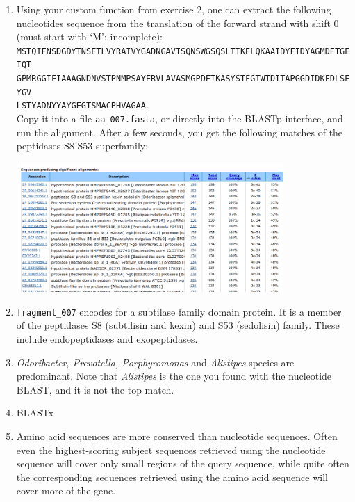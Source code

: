 \documentclass[a4paper,11pt]{article}
\begin{document}
\begin{enumerate}
\item Using your custom function from exercise 2, one can extract the following nucleotides sequence from the translation of the forward strand with shift 0 (must start with `M'; incomplete): \\ \texttt{MSTQIFNSDGDYTNSETLVYRAIVYGADNGAVISQNSWGSQSLTIKELQKAAIDYFIDYAGMDETGEIQT \\ GPMRGGIFIAAAGNDNVSTPNMPSAYERVLAVASMGPDFTKASYSTFGTWTDITAPGGDIDKFDLSEYGV \\ LSTYADNYYAYGEGTSMACPHVAGAA}.\\
Copy it into a file \texttt{aa\_007.fasta}, or directly into the BLASTp interface, and run the alignment. After a few seconds, you get the following matches of the peptidases S8 S53 superfamily:

\vspace{0.5cm}
\begin{center}
\includegraphics[width=0.8\textwidth]{blastp.png}
\end{center}
\vspace{0.5cm}

\item \texttt{fragment\_007} encodes for a subtilase family domain protein. It is a member of the peptidases S8 (subtilisin and kexin) and S53 (sedolisin) family. These include endopeptidases and exopeptidases.

\item  \emph{Odoribacter, Prevotella, Porphyromonas} and \emph{Alistipes} species are predominant. Note that \emph{Alistipes} is the one you found with the nucleotide BLAST, and it is not the top match.

\item BLASTx

\item Amino acid sequences are more conserved than nucleotide sequences. Often even the highest-scoring subject sequences retrieved using the nucleotide sequence will cover only small regions of the query sequence, while quite often the corresponding sequences retrieved using the amino acid sequence will cover more of the gene.

\end{enumerate}
\end{document}

